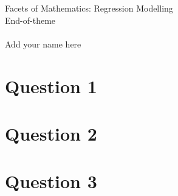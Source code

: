 \documentclass[11pt]{article}
\begin{document}
\FloatBarrier
\begin{center}
{\LARGE Facets of Mathematics: Regression Modelling\\End-of-theme} \\~\\
{\large Add your name here}
\end{center}

\section*{Question 1}



\section*{Question 2}



\section*{Question 3}
\end{document}
